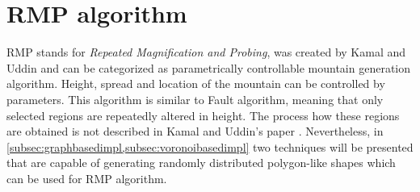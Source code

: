 \documentclass[11pt,a4paper,twoside,openright]{report}
\begin{document}
\section{RMP algorithm}
RMP stands for \emph{Repeated Magnification and Probing}, was created by Kamal and Uddin \cite{Kamal:2007:PCT:1321261.1321264} and can be categorized as parametrically controllable mountain generation algorithm. Height, spread and location of the mountain can be controlled by parameters. This algorithm is similar to Fault algorithm, meaning that only selected regions are repeatedly altered in height. The process how these regions are obtained is not described in Kamal and Uddin's paper \cite{Kamal:2007:PCT:1321261.1321264}. Nevertheless, in \cref{subsec:graphbasedimpl,subsec:voronoibasedimpl} two techniques will be presented that are capable of generating randomly distributed polygon-like shapes which can be used for RMP algorithm.
\end{document}
